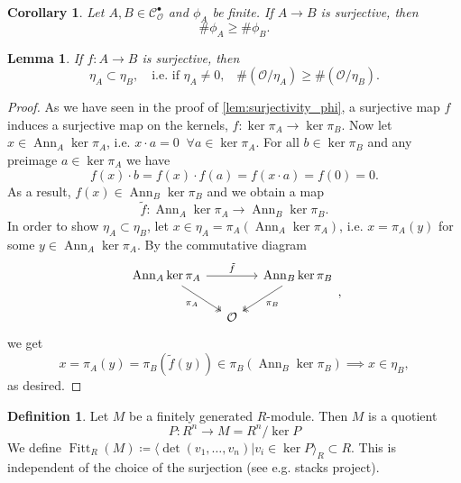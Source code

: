 \documentclass{article}
\theoremstyle{plain}%
\newtheorem{lemma}[theorem]{Lemma}
\newtheorem{corollary}[theorem]{Corollary}
\theoremstyle{definition}
\newtheorem{definition}[theorem]{Definition}
\theoremstyle{remark}
\newcommand{\cob}{\mathcal{C}_\mathcal{O}^\bullet}
\newcommand{\ann}{\operatorname{Ann}}
\newcommand{\fitt}{\operatorname{Fitt}}
\begin{document}
\begin{corollary}\label{cor:surjectivity_phi}
    Let \(A, B\in \cob\) and \(\phi_A\) be finite. %
    If \(A \to B\) is surjective, then \[\# \phi_A \geq \# \phi_B.\]
\end{corollary}

\begin{lemma}\label{lem:surjectivity_eta}
    If \(f \colon A \to B\) is surjective, then
    \begin{equation}
        \eta_A \subset \eta_B, \quad \text{i.e. if \(\eta_A \neq 0\),}\quad \#(\mathcal{O}/\eta_A) \geq \#(\mathcal{O}/\eta_B).  
    \end{equation}
\end{lemma}
\begin{proof}
    As we have seen in the proof of \cref{lem:surjectivity_phi}, a surjective map \(f\) induces a surjective
    map on the kernels, \(f\colon \ker \pi_A \to \ker\pi_B\).
    Now let \(x \in \ann_A \ker \pi_A\), i.e. \(x \cdot a = 0\;\; \forall a \in \ker \pi_A\).
    For all \(b \in \ker \pi_B\) and any preimage \(a \in \ker \pi_A\) we have
    \[
        f(x) \cdot b = f(x) \cdot f(a) = f(x \cdot a) = f(0) = 0.
    \]
    As a result, \(f(x) \in \ann_B\ker \pi_B\) and we obtain a map
    \[
        \tilde f\colon\ann_A\ker \pi_A \to \ann_B \ker \pi_B.  
    \]
    In order to show \(\eta_A \subset \eta_B\), let \(x \in \eta_A = \pi_A(\ann_A \ker \pi_A)\), i.e.
    \(x = \pi_A(y)\) for some \(y \in \ann_A \ker \pi_A\). By the commutative diagram
    \[
    \begin{tikzcd}[column sep=small]
        \ann_A \ker \pi_A \arrow[rr, "\tilde f"] \arrow [dr, "\pi_A", swap, twoheadrightarrow] 
        & & \ann_B \ker \pi_B \arrow [dl, "\pi_B", twoheadrightarrow]\\
        & \mathcal{O} &
    \end{tikzcd},
    \]
    we get
    \[
        x = \pi_A(y) = \pi_B(\tilde f(y)) \in \pi_B(\ann_B \ker \pi_B) \implies x \in \eta_B,
    \]
    as desired.
\end{proof}

\begin{definition}
    Let \(M\) be a finitely generated \(R\)-module. Then \(M\) is a quotient
    \[
        P \colon R^n \longrightarrow M = R^n/\ker P
    \]
    We define \(\fitt_R(M) \coloneqq \langle \det(v_1, \dots, v_n) | v_i \in \ker P \rangle_R \subset R\).
    This is independent of the choice of the surjection (see e.g. stacks project).
\end{definition}
\end{document}
